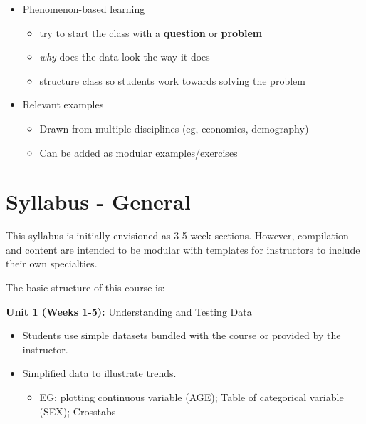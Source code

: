 \documentclass[
]{book}
\providecommand{\tightlist}{%
  \setlength{\itemsep}{0pt}\setlength{\parskip}{0pt}}
\begin{document}
\begin{itemize}
\tightlist
\item
  Phenomenon-based learning

  \begin{itemize}
  \tightlist
  \item
    try to start the class with a \textbf{question} or \textbf{problem}
  \item
    \emph{why} does the data look the way it does
  \item
    structure class so students work towards solving the problem
  \end{itemize}
\item
  Relevant examples

  \begin{itemize}
  \tightlist
  \item
    Drawn from multiple disciplines (eg, economics, demography)
  \item
    Can be added as modular examples/exercises
  \end{itemize}
\end{itemize}

\hypertarget{syllabus---general}{%
\section*{Syllabus - General}\label{syllabus---general}}

This syllabus is initially envisioned as 3 5-week sections. However, compilation and content are intended to be modular with templates for instructors to include their own specialties.

The basic structure of this course is:

\textbf{Unit 1 (Weeks 1-5):} Understanding and Testing Data

\begin{itemize}
\tightlist
\item
  Students use simple datasets bundled with the course or provided by the instructor.
\item
  Simplified data to illustrate trends.

  \begin{itemize}
  \tightlist
  \item
    EG: plotting continuous variable (AGE); Table of categorical variable (SEX); Crosstabs
  \end{itemize}
\end{itemize}
\end{document}
